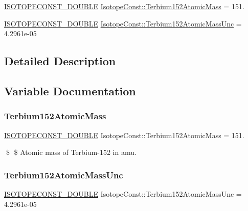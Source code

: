 \begin{DoxyCompactItemize}
\item 
\mbox{\hyperlink{group___isotope_const-_macros_ga8f45a7272ce02c0b4c65c44636ed719a}{I\+S\+O\+T\+O\+P\+E\+C\+O\+N\+S\+T\+\_\+\+D\+O\+U\+B\+LE}} \mbox{\hyperlink{group___isotope_const-_terbium-_tb152_gac5f4716370754a33ba4b160f71573e2f}{Isotope\+Const\+::\+Terbium152\+Atomic\+Mass}} = 151.
\item 
\mbox{\hyperlink{group___isotope_const-_macros_ga8f45a7272ce02c0b4c65c44636ed719a}{I\+S\+O\+T\+O\+P\+E\+C\+O\+N\+S\+T\+\_\+\+D\+O\+U\+B\+LE}} \mbox{\hyperlink{group___isotope_const-_terbium-_tb152_ga024da90e63fa699c7e673138eeedf462}{Isotope\+Const\+::\+Terbium152\+Atomic\+Mass\+Unc}} = 4.\+2961e-\/05
\end{DoxyCompactItemize}


\subsection{Detailed Description}


\subsection{Variable Documentation}
\mbox{\label{group___isotope_const-_terbium-_tb152_gac5f4716370754a33ba4b160f71573e2f}} 
\subsubsection{\texorpdfstring{Terbium152\+Atomic\+Mass}{Terbium152AtomicMass}}
{\footnotesize\ttfamily \mbox{\hyperlink{group___isotope_const-_macros_ga8f45a7272ce02c0b4c65c44636ed719a}{I\+S\+O\+T\+O\+P\+E\+C\+O\+N\+S\+T\+\_\+\+D\+O\+U\+B\+LE}} Isotope\+Const\+::\+Terbium152\+Atomic\+Mass = 151.}

\$ \$ Atomic mass of Terbium-\/152 in amu. \mbox{\label{group___isotope_const-_terbium-_tb152_ga024da90e63fa699c7e673138eeedf462}} 
\subsubsection{\texorpdfstring{Terbium152\+Atomic\+Mass\+Unc}{Terbium152AtomicMassUnc}}
{\footnotesize\ttfamily \mbox{\hyperlink{group___isotope_const-_macros_ga8f45a7272ce02c0b4c65c44636ed719a}{I\+S\+O\+T\+O\+P\+E\+C\+O\+N\+S\+T\+\_\+\+D\+O\+U\+B\+LE}} Isotope\+Const\+::\+Terbium152\+Atomic\+Mass\+Unc = 4.\+2961e-\/05}

